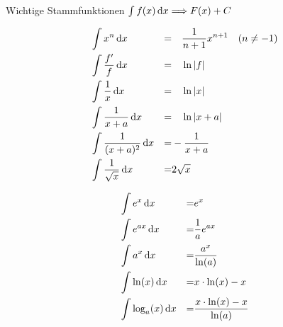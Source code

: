 \begin{highlight}{Wichtige Stammfunktionen}
    $\int f(x) \dif x \Longrightarrow F(x) + C$
    \begin{center}
        \begin{minipage}{0.45\linewidth}
            \begin{align*}
                &\int x^n \dif x  &=&  \quad \frac{1}{n+1}x^{n+1} \quad (n \neq -1) \\
                &\int \frac{f'}{f} \dif x  &=&  \quad \ln \left\lvert f \right\rvert  \\
                &\int \frac{1}{x} \dif x  &=& \quad \ln \left\lvert x \right\rvert  \\
                &\int \frac{1}{x+a} \dif x  &=&  \quad \ln \left\lvert x+a \right\rvert \\
                &\int \frac{1}{(x+a)^2} \dif x  &=&  -\frac{1}{x+a}  \\
                &\int \frac{1}{\sqrt{x}}\dif x  &=&  2 \sqrt{x}  \\
            \end{align*}
        \end{minipage}
        \hfill\vline\hfill
        \begin{minipage}{0.45\linewidth}
            \begin{align*}
                &\int e^{x} \dif x  &=& e^{x} \\
                &\int e^{ax} \dif x  &=&  \frac{1}{a} e^{ax}  \\
                &\int a^{x} \dif x \quad  &=& \frac{a^{x}}{\ln (a)} \\
                &\int \ln (x) \dif x  &=& x \cdot \ln (x)-x \\
                &\int \log_{a}(x) \dif x  &=& \frac{x \cdot \ln (x)-x}{\ln (a)} \\
            \end{align*}
        \end{minipage}
    \end{center}


\end{highlight}
